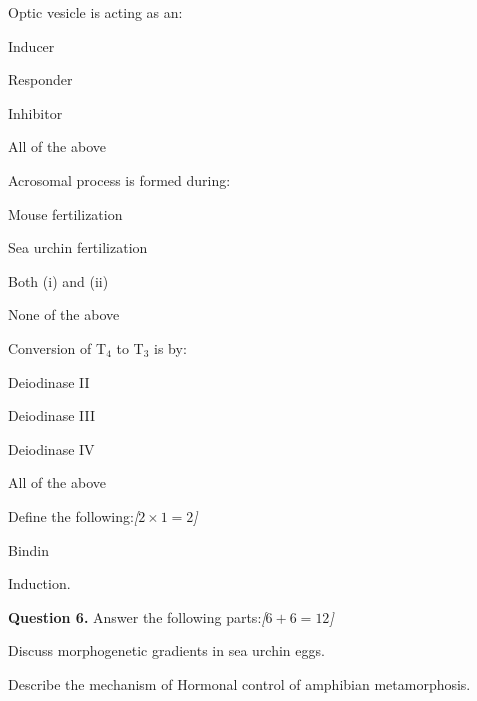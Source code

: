 \documentclass[11pt,a4paper]{article}
\newcommand{\pts}[1]{\hfill   \textit{[#1]}}
\begin{document}
\begin{parts}
\begin{parts}
    \item Optic vesicle is acting as an:
    
\begin{parts}
      \item Inducer
      \item Responder
      \item Inhibitor
      \item All of the above
    \end{parts}

    \item Acrosomal process is formed during:
    
\begin{parts}
      \item Mouse fertilization
      \item Sea urchin fertilization
      \item Both (i) and (ii)
      \item None of the above
    \end{parts}

    \item Conversion of T$_4$ to T$_3$ is by:
    
\begin{parts}
      \item Deiodinase II
      \item Deiodinase III
      \item Deiodinase IV
      \item All of the above
    \end{parts}
  \end{parts}

  \item Define the following:\pts{$2  \times 1 = 2$}
  
\begin{parts}
    \item Bindin
    \item Induction.
  \end{parts}
\end{parts}

\medskip


\noindent   \textbf{Question 6.} Answer the following parts:\pts{$6 + 6 = 12$}

\begin{parts}
  \item Discuss morphogenetic gradients in sea urchin eggs.
  \item Describe the mechanism of Hormonal control of amphibian metamorphosis.
\end{parts}
\end{document}
